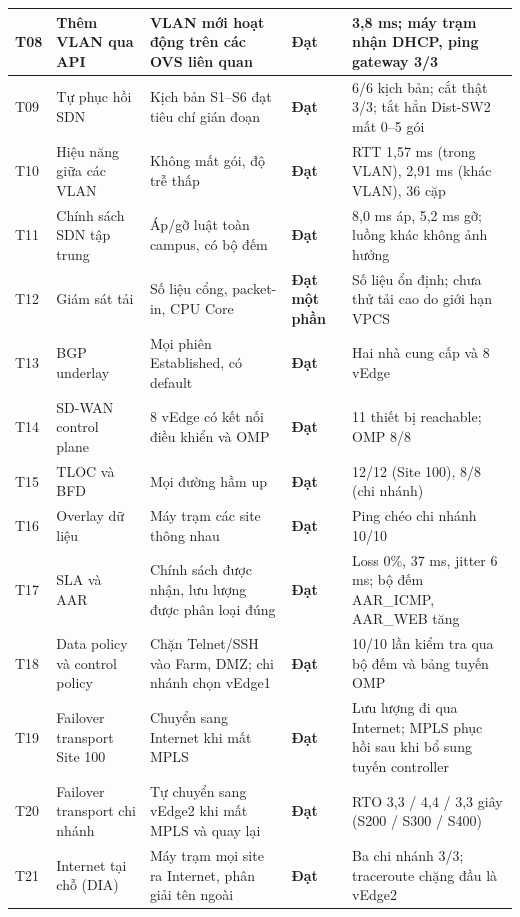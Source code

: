 \begin{longtable}{|P{0.7cm}|P{2.8cm}|P{3.4cm}|P{1.8cm}|P{4.0cm}|}
    \hline
    T08 & Thêm VLAN qua API & VLAN mới hoạt động trên các OVS liên quan & \textbf{Đạt} & 3,8 ms; máy trạm nhận DHCP, ping gateway 3/3 \\
    \hline
    T09 & Tự phục hồi SDN & Kịch bản S1--S6 đạt tiêu chí gián đoạn & \textbf{Đạt} & 6/6 kịch bản; cắt thật 3/3; tắt hẳn Dist-SW2 mất 0--5 gói \\
    \hline
    T10 & Hiệu năng giữa các VLAN & Không mất gói, độ trễ thấp & \textbf{Đạt} & RTT 1,57 ms (trong VLAN), 2,91 ms (khác VLAN), 36 cặp \\
    \hline
    T11 & Chính sách SDN tập trung & Áp/gỡ luật toàn campus, có bộ đếm & \textbf{Đạt} & 8,0 ms áp, 5,2 ms gỡ; luồng khác không ảnh hưởng \\
    \hline
    T12 & Giám sát tải & Số liệu cổng, packet-in, CPU Core & \textbf{Đạt một phần} & Số liệu ổn định; chưa thử tải cao do giới hạn VPCS \\
    \hline
    T13 & BGP underlay & Mọi phiên Established, có default & \textbf{Đạt} & Hai nhà cung cấp và 8 vEdge \\
    \hline
    T14 & SD-WAN control plane & 8 vEdge có kết nối điều khiển và OMP & \textbf{Đạt} & 11 thiết bị reachable; OMP 8/8 \\
    \hline
    T15 & TLOC và BFD & Mọi đường hầm up & \textbf{Đạt} & 12/12 (Site 100), 8/8 (chi nhánh) \\
    \hline
    T16 & Overlay dữ liệu & Máy trạm các site thông nhau & \textbf{Đạt} & Ping chéo chi nhánh 10/10 \\
    \hline
    T17 & SLA và AAR & Chính sách được nhận, lưu lượng được phân loại đúng & \textbf{Đạt} & Loss 0\%, 37 ms, jitter 6 ms; bộ đếm AAR\_ICMP, AAR\_WEB tăng \\
    \hline
    T18 & Data policy và control policy & Chặn Telnet/SSH vào Farm, DMZ; chi nhánh chọn vEdge1 & \textbf{Đạt} & 10/10 lần kiểm tra qua bộ đếm và bảng tuyến OMP \\
    \hline
    T19 & Failover transport Site 100 & Chuyển sang Internet khi mất MPLS & \textbf{Đạt} & Lưu lượng đi qua Internet; MPLS phục hồi sau khi bổ sung tuyến controller \\
    \hline
    T20 & Failover transport chi nhánh & Tự chuyển sang vEdge2 khi mất MPLS và quay lại & \textbf{Đạt} & RTO 3,3 / 4,4 / 3,3 giây (S200 / S300 / S400) \\
    \hline
    T21 & Internet tại chỗ (DIA) & Máy trạm mọi site ra Internet, phân giải tên ngoài & \textbf{Đạt} & Ba chi nhánh 3/3; traceroute chặng đầu là vEdge2 \\

\end{longtable}
